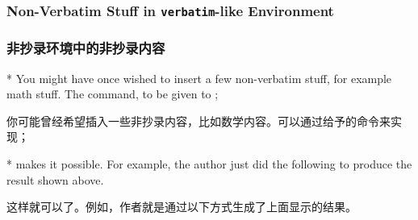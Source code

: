 

\begin{paracol}{2}
\subsubsection{Non-Verbatim Stuff in \texttt{verbatim}-like Environment}
\label{sec:usage-var-nonverb}
\switchcolumn
\subsubsection{非抄录环境中的非抄录内容}

\switchcolumn[0]*
\DescribeMacro{\VVBnonverb}
You might have once wished to insert a few non-verbatim stuff, for example 
math stuff.  The command, to be given to ;

\begin{quote}
\begin{verbatimwithnv}
\end{verbatimwithnv}
\end{quote}
\switchcolumn
你可能曾经希望插入一些非抄录内容，比如数学内容。可以通过给予的命令来实现；
\begin{quote}
\begin{verbatimwithnv}
\end{verbatimwithnv}
\end{quote}


\switchcolumn[0]*
makes it possible.  For example, the author just did the following to
produce the result shown above.

\begin{iverbatim}
\begin{verbatimwithnv}
\end{verbatimwithnv}
\end{iverbatim}
\switchcolumn
这样就可以了。例如，作者就是通过以下方式生成了上面显示的结果。
\begin{iverbatim}
\begin{verbatimwithnv}
\end{verbatimwithnv}
\end{iverbatim}



\end{paracol}
